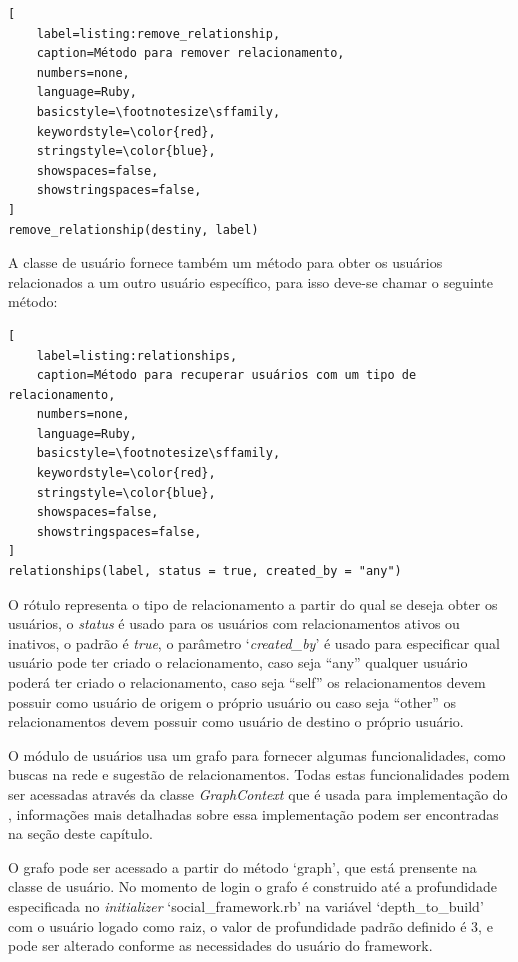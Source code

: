 \begin{lstlisting}[
    label=listing:remove_relationship,
    caption=Método para remover relacionamento,
    numbers=none,
    language=Ruby,
    basicstyle=\footnotesize\sffamily,
    keywordstyle=\color{red},
    stringstyle=\color{blue},
    showspaces=false,
    showstringspaces=false,
]
remove_relationship(destiny, label)
\end{lstlisting}

A classe de usuário fornece também um método para obter os usuários relacionados a um outro usuário específico, para isso deve-se chamar o seguinte método:

\begin{lstlisting}[
    label=listing:relationships,
    caption=Método para recuperar usuários com um tipo de relacionamento,
    numbers=none,
    language=Ruby,
    basicstyle=\footnotesize\sffamily,
    keywordstyle=\color{red},
    stringstyle=\color{blue},
    showspaces=false,
    showstringspaces=false,
]
relationships(label, status = true, created_by = "any")
\end{lstlisting}

O rótulo representa o tipo de relacionamento a partir do qual se deseja obter os usuários, o \textit{status} é usado para os usuários com relacionamentos ativos ou inativos, o padrão é \textit{true}, o parâmetro `\textit{created\_by}' é usado para especificar qual usuário pode ter criado o relacionamento, caso seja ``any'' qualquer usuário poderá ter criado o relacionamento, caso seja ``self'' os relacionamentos devem possuir como usuário de origem o próprio usuário ou caso seja ``other'' os relacionamentos devem possuir como usuário de destino o próprio usuário.

O módulo de usuários usa um grafo para fornecer algumas funcionalidades, como buscas na rede e sugestão de relacionamentos. Todas estas funcionalidades podem ser acessadas através da classe \textit{GraphContext} que é usada para implementação do , informações mais detalhadas sobre essa implementação podem ser encontradas na seção  deste capítulo.

O grafo pode ser acessado a partir do método `graph', que está prensente na classe de usuário. No momento de login o grafo é construido até a profundidade especificada no \textit{initializer} `social\_framework.rb' na variável `depth\_to\_build' com o usuário logado como raiz, o valor de profundidade padrão definido é 3, e pode ser alterado conforme as necessidades do usuário do framework.

